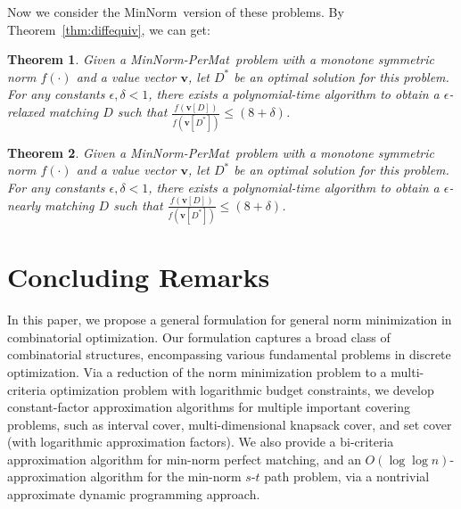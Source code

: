 \documentclass[11pt,a4paper]{article} \usepackage{enumitem}
\newcommand{\assigned}[1]{[ #1 ]}
\newcommand{\boldv}{\boldsymbol{v}}
\newcommand{\minnorm}{\textsf{MinNorm}}
\newcommand{\minnormmatch}{\textsf{MinNorm-PerMat}}
\newtheorem{theorem}{Theorem}[section]
\theoremstyle{definition}
\begin{document}
Now we consider the \minnorm\ version of these problems. By Theorem~\ref{thm:diffequiv}, we can get:

\begin{theorem}
\label{thm:normrelaxmatching}
Given a \minnormmatch\ problem with a monotone symmetric 
norm $f(\cdot)$ and a value vector $\boldv$, let $D^{*}$ be an optimal solution for this problem.
For any constants $\epsilon,\delta<1$, there exists a polynomial-time algorithm to obtain a $\epsilon$-relaxed matching $D$ such that $\frac{f(\boldv\assigned{D})}{f(\boldv\assigned{D^{*}})}\leq (8+\delta)$.
\end{theorem}

\begin{theorem}
\label{matching-i5}
Given a \minnormmatch\ problem with a monotone symmetric 
norm $f(\cdot)$ and a value vector $\boldv$, let $D^{*}$ be an optimal solution for this problem.
For any constants $\epsilon,\delta<1$, there exists a polynomial-time algorithm to obtain a $\epsilon$-nearly matching $D$ such that $\frac{f(\boldv\assigned{D})}{f(\boldv\assigned{D^{*}})}\leq (8+\delta)$.
\end{theorem}
 \section{Concluding Remarks}

In this paper, we propose a general formulation for general norm minimization in combinatorial optimization. Our formulation captures a broad class of combinatorial structures, encompassing various fundamental problems in discrete optimization. Via a reduction of the norm minimization problem to a multi-criteria optimization problem with logarithmic budget constraints, we develop constant-factor approximation algorithms for multiple important covering problems, such as interval cover, multi-dimensional knapsack cover, and set cover (with logarithmic approximation factors). We also provide a bi-criteria approximation algorithm for min-norm perfect matching, and an $O(\log\log n)$-approximation algorithm
for the min-norm $s$-$t$ path problem, via a nontrivial approximate dynamic programming approach.
\end{document}
